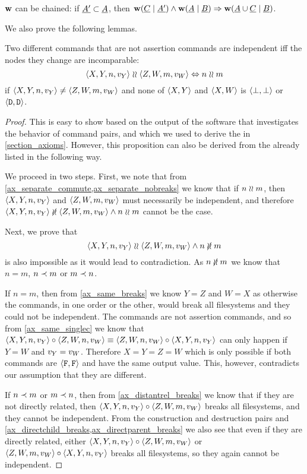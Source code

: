 \begin{mycor}\label{workschained}
$\mathbf{w}$ can be chained:
if $\underline{A'}\subset\underline{A}$, then
$ \mathbf{w}({\underline{C}}\mathrel{|}{\underline{A'}}) \wedge \mathbf{w}({\underline{A}}\mathrel{|}{\underline{B}}) \Rightarrow \mathbf{w}({\underline{A}\cup\underline{C}}\mathrel{|}{\underline{B}})$.
\end{mycor}

We also prove the following lemmas.

\begin{mylem}\label{incomparable_is_independent}
Two different commands that are not assertion commands are independent iff the nodes they change are incomparable:
\[ \langle{X,Y,n,v_Y}\rangle\mathrel{\wr\wr}\langle{Z,W,m,v_W}\rangle \Leftrightarrow n\mathrel{\wr\wr} m \]
if $\langle{X,Y,n,v_Y}\rangle\neq\langle{Z,W,m,v_W}\rangle$ and none of $\langle{X,Y}\rangle$ and $\langle{X,W}\rangle$ is $\langle{\bot,\bot}\rangle$ or $\langle{\mathtt{D},\mathtt{D}}\rangle$.
\end{mylem}
\begin{proof}
This is easy to show based on the output of the software that investigates the behavior of command pairs,
and which we used to derive the  in \cref{section_axioms}.
However, this proposition can also be derived from the  already listed
in the following way.

We proceed in two steps. First, we note that
from \cref{ax_separate_commute,ax_separate_nobreaks} we know that
if $n\mathrel{\wr\wr} m$, then $\langle{X,Y,n,v_Y}\rangle$ and $\langle{Z,W,m,v_W}\rangle$ must necessarily be independent, and therefore
$ \cxynv\nindep\czwmv \wedge n\unrel m $ cannot be the case.

Next, we prove that
\[ \cxynv\indep\czwmv \wedge n\nunrel m \] is also impossible as it would lead to contradiction.
As $n\nunrel m$
we know that $n=m$, $n\prec m$ or $m\prec n$.

If $n=m$, then from \cref{ax_same_breaks} we know $Y=Z$ and $W=X$
as otherwise the commands, in one order or the other, would break all filesystems
and they could not be independent.
The commands are not assertion commands, and so from \cref{ax_same_singlec}
we know that $\langle{X,Y,n,v_Y}\rangle\circ\langle{Z,W,n,v_W}\rangle\equiv\langle{Z,W,n,v_W}\rangle\circ\langle{X,Y,n,v_Y}\rangle$ can only happen if $Y=W$ and $v_Y=v_W$.
Therefore $X=Y=Z=W$ which is only possible if both commands are $\langle{\mathtt{F},\mathtt{F}}\rangle$ and have the same
output value. This, however, contradicts our assumption that they are different.

If $n\prec m$ or $m\prec n$, then
from \cref{ax_distantrel_breaks} we know that if they are not directly related,
then $\langle{X,Y,n,v_Y}\rangle\circ\langle{Z,W,m,v_W}\rangle$ breaks all filesystems, and they cannot be independent.
From the construction and destruction pairs and 
\cref{ax_directchild_breaks,ax_directparent_breaks} we also see that
even if they are directly related, either
$\langle{X,Y,n,v_Y}\rangle\circ\langle{Z,W,m,v_W}\rangle$ or $\langle{Z,W,m,v_W}\rangle\circ\langle{X,Y,n,v_Y}\rangle$ 
breaks all filesystems, so they again cannot be independent.
\end{proof}

